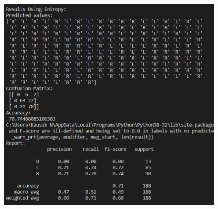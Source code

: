 \documentclass[12pt]{article}
\renewcommand{\_}{\kern-1.5pt\textunderscore\kern-1.5pt}
\begin{document}
\begin{figure}[H]
	\begin{Center}
		\includegraphics[width=6.5in,height=6.21in]{./media/image13.png}
	\end{Center}
\end{figure}



\par


\vspace{\baselineskip}

\vspace{\baselineskip}

\vspace{\baselineskip}

\vspace{\baselineskip}

\vspace{\baselineskip}

\vspace{\baselineskip}

\vspace{\baselineskip}
\end{document}
